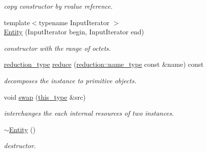 \begin{DoxyCompactItemize}
\begin{DoxyCompactList}\small\item\em copy constructor by rvalue reference. \end{DoxyCompactList}\item 
\hypertarget{classhryky_1_1uri_1_1scheme_1_1_entity_a112fa321ebade92f0f6cff0a598260ea}{{\footnotesize template$<$typename Input\-Iterator $>$ }\\\hyperlink{classhryky_1_1uri_1_1scheme_1_1_entity_a112fa321ebade92f0f6cff0a598260ea}{Entity} (Input\-Iterator begin, Input\-Iterator end)}\label{classhryky_1_1uri_1_1scheme_1_1_entity_a112fa321ebade92f0f6cff0a598260ea}

\begin{DoxyCompactList}\small\item\em constructor with the range of octets. \end{DoxyCompactList}\item 
\hypertarget{classhryky_1_1uri_1_1scheme_1_1_entity_a4d552e15a9672f53b2c5f17441b2f491}{\hyperlink{namespacehryky_a343a9a4c36a586be5c2693156200eadc}{reduction\-\_\-type} \hyperlink{classhryky_1_1uri_1_1scheme_1_1_entity_a4d552e15a9672f53b2c5f17441b2f491}{reduce} (\hyperlink{namespacehryky_1_1reduction_ac686c30a4c8d196bbd0f05629a6b921f}{reduction\-::name\-\_\-type} const \&name) const }\label{classhryky_1_1uri_1_1scheme_1_1_entity_a4d552e15a9672f53b2c5f17441b2f491}

\begin{DoxyCompactList}\small\item\em decomposes the instance to primitive objects. \end{DoxyCompactList}\item 
\hypertarget{classhryky_1_1uri_1_1scheme_1_1_entity_ae40eb04704bee792414502147617e84e}{void \hyperlink{classhryky_1_1uri_1_1scheme_1_1_entity_ae40eb04704bee792414502147617e84e}{swap} (\hyperlink{classhryky_1_1uri_1_1scheme_1_1_entity_aa2f5c1de6e49bee58c948b3534811e03}{this\-\_\-type} \&src)}\label{classhryky_1_1uri_1_1scheme_1_1_entity_ae40eb04704bee792414502147617e84e}

\begin{DoxyCompactList}\small\item\em interchanges the each internal resources of two instances. \end{DoxyCompactList}\item 
\hypertarget{classhryky_1_1uri_1_1scheme_1_1_entity_a28db8e63ac1e32784d7c13ab8a0b76d7}{\hyperlink{classhryky_1_1uri_1_1scheme_1_1_entity_a28db8e63ac1e32784d7c13ab8a0b76d7}{$\sim$\-Entity} ()}\label{classhryky_1_1uri_1_1scheme_1_1_entity_a28db8e63ac1e32784d7c13ab8a0b76d7}

\begin{DoxyCompactList}\small\item\em destructor. \end{DoxyCompactList}\end{DoxyCompactItemize}
